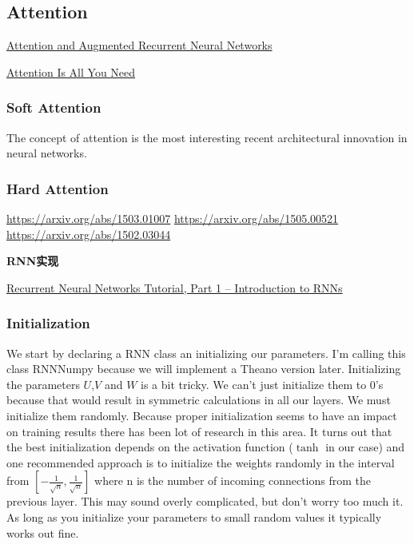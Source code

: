 \subsection{Attention}
\href{https://distill.pub/2016/augmented-rnns/}{Attention and Augmented Recurrent Neural Networks}

\href{https://arxiv.org/abs/1706.03762}{Attention Is All You Need}

\subsubsection{Soft Attention}
The concept of attention is the most interesting recent architectural innovation in neural networks.

\subsubsection{Hard Attention}
\href{Inferring Algorithmic Patterns with Stack-Augmented Recurrent Nets}{https://arxiv.org/abs/1503.01007}
\href{Reinforcement Learning Neural Turing Machines - Revised}{https://arxiv.org/abs/1505.00521}
\href{Show, Attend and Tell: Neural Image Caption Generation with Visual Attention}{https://arxiv.org/abs/1502.03044}


\textbf{RNN实现}

\href{http://www.wildml.com/2015/09/recurrent-neural-networks-tutorial-part-1-introduction-to-rnns/}{Recurrent Neural Networks Tutorial, Part 1 – Introduction to RNNs}

\subsubsection{Initialization}
We start by declaring a RNN class an initializing our parameters. I'm calling this class RNNNumpy because we will implement a Theano version later. Initializing the parameters $U$,$V$ and $W$ is a bit tricky. We can't just initialize them to 0's because that would result in symmetric calculations in all our layers. We must initialize them randomly. Because proper initialization seems to have an impact on training results there has been lot of research in this area. It turns out that the best initialization depends on the activation function ($\tanh$ in our case) and one recommended approach is to initialize the weights randomly in the interval from $\left[-\frac{1}{\sqrt{n}}, \frac{1}{\sqrt{n}}\right]$ where n is the number of incoming connections from the previous layer. This may sound overly complicated, but don't worry too much it. As long as you initialize your parameters to small random values it typically works out fine.

